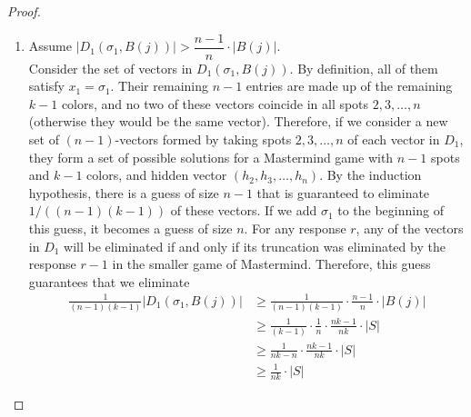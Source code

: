\documentclass[12pt, a4paper]{article}
\begin{document}
\begin{proof}
\begin{enumerate}[label=\roman*.]
		\item Assume $|D_1(\sigma_1,B(j))|> \dfrac{n-1}{n}\cdot|B(j)|$.\\
		Consider the set of vectors in $D_1(\sigma_1, B(j))$. By definition,
		all of them satisfy $x_1 = \sigma_1$. Their remaining
		$n-1$ entries are made up of the remaining $k-1$ colors, and no two of
		these vectors coincide in all spots $2, 3, \ldots, n$ (otherwise they would be
		the same vector). Therefore, if we consider a new set of $(n-1)$-vectors formed by taking spots $2, 3, \ldots, n$ of each vector in $D_1$, they form a set of possible solutions for a
		Mastermind game with $n-1$ spots and $k-1$ colors, and hidden vector $(h_2, h_3, \ldots, h_n)$. By the induction
		hypothesis, there is a guess of size $n-1$ that is guaranteed to
		eliminate $1/((n-1)(k-1))$ of these vectors. If we add $\sigma_1$
		to the
		beginning of this guess, it becomes a guess of size $n$. For any
		response $r$, any of the vectors in $D_1$ will be eliminated
		if and only if its truncation was eliminated
		by the response $r-1$ in the smaller game of Mastermind. 
		Therefore, this guess guarantees that we eliminate
		\begin{align*}
		\frac{1}{(n-1)(k-1)}|D_1(\sigma_1,B(j))|
		& \ge \frac{1}{(n-1)(k-1)}\cdot\frac{n-1}{n}\cdot|B(j)|\\
		& \ge \frac{1}{(k-1)}\cdot\frac{1}{n}
		\cdot\frac{nk-1}{nk}\cdot|S|\\
		& \ge \frac{1}{nk-n}\cdot\frac{nk-1}{nk}\cdot|S|\\
		& \ge \frac{1}{nk}\cdot|S|
		\end{align*}
	

\end{enumerate}
\end{proof}
\end{document}
